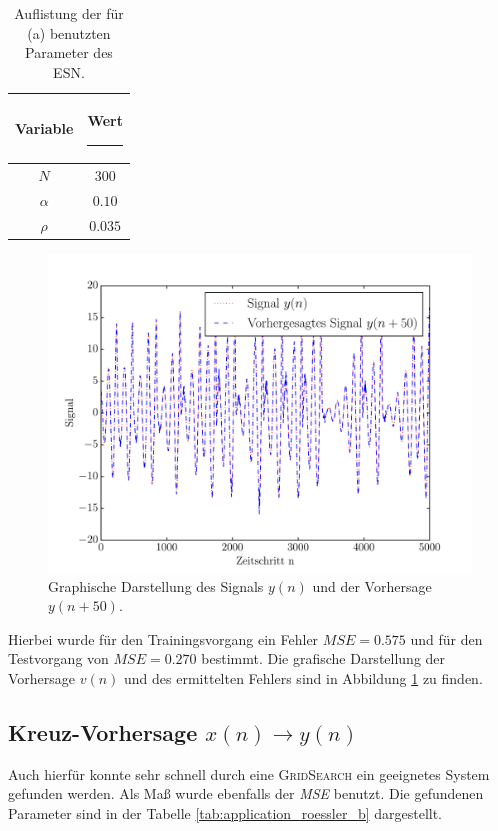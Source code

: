 \begin{table}[H]
	\centering
		\begin{tabular}{|c|c|}
		\rule[-1ex]{0pt}{4.5ex} Variable & \hspace{4ex} Wert \rule[-1ex]{4ex}{0pt}\\ 
		\hline \hline 
		\rule[-1ex]{0pt}{4.5ex} $N$ & $300$ \\ 
		\hline 
		\rule[-1ex]{0pt}{4.5ex} $\alpha$ & $0.10$ \\ 
		\hline 
		\rule[-1ex]{0pt}{4.5ex} $\rho$ & $0.035$ \\ 
		\hline 
	\end{tabular} 
	\caption{Auflistung der für (a) benutzten Parameter des \textsc{ESN}.}
\label{tab:application_roessler_a}
\end{table}
\begin{figure}[H]
    \centering
    \includegraphics[width = 0.9 \textwidth]{figures/roessler_pred50.pdf}
    \caption{Graphische Darstellung des Signals $y(n)$ und der Vorhersage $y(n+50)$.}
    \label{fig:application_roessler_a}
\end{figure}

Hierbei wurde für den Trainingsvorgang ein Fehler $MSE = 0.575$ und für den Testvorgang von $MSE = 0.270$ bestimmt. Die grafische Darstellung der Vorhersage $v(n)$ und des ermittelten Fehlers sind in Abbildung \ref{fig:application_roessler_a} zu finden.

\subsection{Kreuz-Vorhersage $x(n) \rightarrow y(n)$}
Auch hierfür konnte sehr schnell durch eine \textsc{GridSearch} ein geeignetes System gefunden werden. Als Maß wurde ebenfalls der \textit{MSE} benutzt. Die gefundenen Parameter sind in der Tabelle \ref{tab:application_roessler_b} dargestellt.

